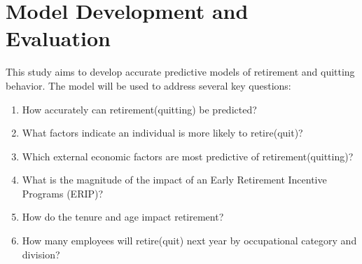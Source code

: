 \documentclass[12pt,letterpaper]{article}
\begin{document}

\section{Model Development and Evaluation}
This study aims to develop accurate predictive models of retirement and quitting behavior. The model will be used to address several key questions:
\begin{enumerate}
\item How accurately can retirement(quitting) be predicted?
\item What factors indicate an individual is more likely to retire(quit)?
\item Which external economic factors are most predictive of retirement(quitting)?
\item What is the magnitude of the impact of an Early Retirement Incentive Programs (ERIP)?
\item How do the tenure and age impact retirement?
\item How many employees will retire(quit) next year by occupational category and division?
\end{enumerate}

\end{document}
